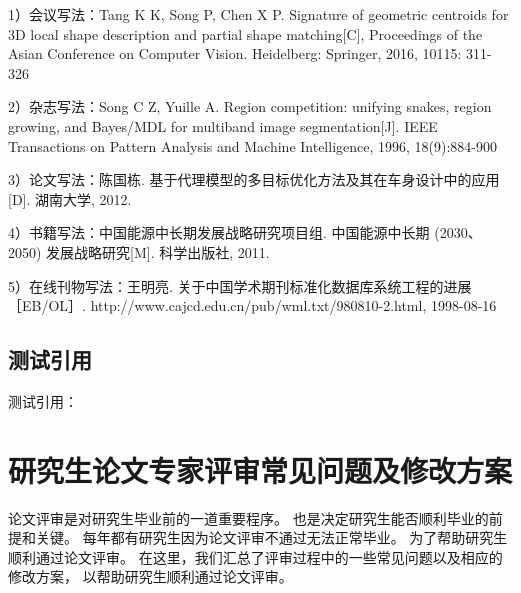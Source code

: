 \documentclass[12pt]{zjutthesis}
\begin{document}
1）会议写法：Tang K K, Song P, Chen X P. Signature of geometric centroids for 3D local shape description and partial shape matching[C], Proceedings of the Asian Conference on Computer Vision. Heidelberg: Springer, 2016, 10115: 311-326

2）杂志写法：Song C Z, Yuille A. Region competition: unifying snakes, region growing, and Bayes/MDL for multiband image segmentation[J]. IEEE Transactions on Pattern Analysis and Machine Intelligence, 1996, 18(9):884-900

3）论文写法：陈国栋. 基于代理模型的多目标优化方法及其在车身设计中的应用[D]. 湖南大学, 2012.

4）书籍写法：中国能源中长期发展战略研究项目组. 中国能源中长期 (2030、2050) 发展战略研究[M]. 科学出版社, 2011.

5）在线刊物写法：王明亮. 关于中国学术期刊标准化数据库系统工程的进展 ［EB/OL］. http://www.cajcd.edu.cn/pub/wml.txt/980810-2.html,  1998-08-16

\section{测试引用}
测试引用：
\cite{zhangkun1994}
\cite{zhukezhen1973}
\cite{dupont1974bone}
\cite{zhengkaiqing1987}
\cite{jiangxizhou1980}
\cite{jianduju1994}
\cite{merkt1995rotational}
\cite{mellinger1996laser}
\cite{bixon1996dynamics}
\cite{mahui1995}
\cite{carlson1981two}
\cite{taylor1983scanning}
\cite{taylor1981study}
\cite{shimizu1983laser}
\cite{atkinson1982experimental}
\cite{kusch1975perturbations}
\cite{guangxi1993} \\
\cite{huosini1989guwu}
\cite{wangfuzhi1865songlun}
\cite{zhaoyaodong1998xinshidai}
\cite{biaozhunhua2002tushu}
\cite{chubanzhuanye2004}
\cite{who1970factors}
\cite{peebles2001probability}
\cite{baishunong1998zhiwu}
\cite{weinstein1974pathogenic}
\cite{hanjiren1985lun}
\cite{dizhi1936dizhi}
\cite{tushuguan1957tushuguanxue}
\cite{aaas1883science}
\cite{fugang2000fengsha}
\cite{xiaoyu2001chubanye}
\cite{oclc2000about}
\cite{scitor2000project}

\chapter{研究生论文专家评审常见问题及修改方案}
论文评审是对研究生毕业前的一道重要程序。
也是决定研究生能否顺利毕业的前提和关键。
每年都有研究生因为论文评审不通过无法正常毕业。
为了帮助研究生顺利通过论文评审。
在这里，我们汇总了评审过程中的一些常见问题以及相应的修改方案，
以帮助研究生顺利通过论文评审。
\end{document}
